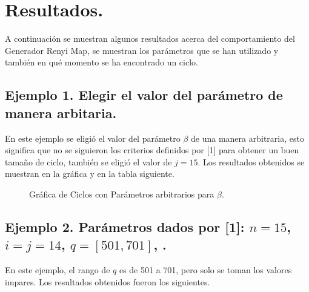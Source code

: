 \documentclass[12pt,3p]{elsarticle}
\begin{document}
\section{Resultados.}
A continuación se muestran algunos resultados acerca del comportamiento del Generador Renyi Map, se muestran los parámetros que se han utilizado y también en qué momento se ha encontrado un ciclo.

\subsection{Ejemplo 1. Elegir el valor del parámetro de manera arbitaria.}
En este ejemplo se eligió el valor del parámetro $\beta$ de una manera arbitraria, esto significa que no se siguieron los criterios definidos por [1] para obtener un buen tamaño de ciclo, también se eligió el valor de $j=15$. Los resultados obtenidos se muestran en la gráfica y en la tabla siguiente.

\begin{figure}[H]
\centering
{}
\caption{Gráfica de Ciclos con Parámetros arbitrarios para $\beta$.} \label{Param}
\end{figure}






\subsection{Ejemplo 2. Parámetros dados por [1]: $ n=15$, $ i=j=14$, $ q=[501,701]$,  .}
En este ejemplo, el rango de $q$ es de 501 a 701, pero solo se toman los valores impares. Los resultados obtenidos fueron los siguientes.
\end{document}

